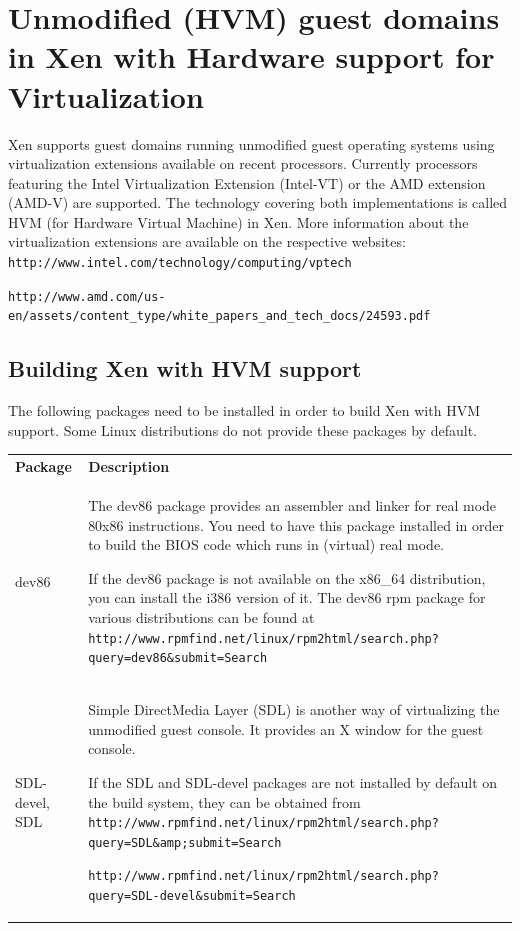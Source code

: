 \documentclass[11pt,twoside,final,openright]{report}
\begin{document}

\appendix

\chapter{Unmodified (HVM) guest domains in Xen with Hardware support for Virtualization}

Xen supports guest domains running unmodified guest operating systems using
virtualization extensions available on recent processors. Currently processors
featuring the Intel Virtualization Extension (Intel-VT) or the AMD extension
(AMD-V) are supported. The technology covering both implementations is
called HVM (for Hardware Virtual Machine) in Xen. More information about the
virtualization extensions are available on the respective websites:
 {\small {\tt http://www.intel.com/technology/computing/vptech}}


 {\small {\tt http://www.amd.com/us-en/assets/content\_type/white\_papers\_and\_tech\_docs/24593.pdf}}

\section{Building Xen with HVM support}

The following packages need to be installed in order to build Xen with HVM support. Some Linux distributions do not provide these packages by default.

\begin{tabular}{lp{11.0cm}}
{\bfseries Package} & {\bfseries Description} \\

dev86 & The dev86 package provides an assembler and linker for real mode 80x86 instructions. You need to have this package installed in order to build the BIOS code which runs in (virtual) real mode. 

If the dev86 package is not available on the x86\_64 distribution, you can install the i386 version of it. The dev86 rpm package for various distributions can be found at {\scriptsize {\tt http://www.rpmfind.net/linux/rpm2html/search.php?query=dev86\&submit=Search}} \\

SDL-devel, SDL & Simple DirectMedia Layer (SDL) is another way of virtualizing the unmodified guest console. It provides an X window for the guest console. 

If the SDL and SDL-devel packages are not installed by default on the build system, they can be obtained from  {\scriptsize {\tt http://www.rpmfind.net/linux/rpm2html/search.php?query=SDL\&amp;submit=Search}}


{\scriptsize {\tt http://www.rpmfind.net/linux/rpm2html/search.php?query=SDL-devel\&submit=Search}} \\

\end{tabular}
\end{document}
